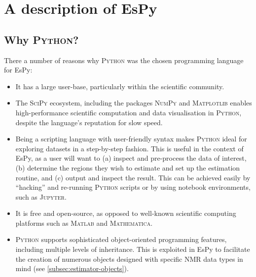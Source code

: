 \section{A description of \acs{EsPy}}

\subsection{Why \textsc{Python}?}
There a number of reasons why \textsc{Python} was the chosen programming
language for \ac{EsPy}:
\begin{itemize}
    \item It has a large user-base, particularly within the scientific
        community.
    \item The \textsc{SciPy} ecosystem\cite{Virtanen2020}, including the packages
        \textsc{NumPy}\cite{Harris2020} and
        \textsc{Matplotlib}\cite{Hunter2007} enables
        high-performance scientific computation and data visualisation in
        \textsc{Python}, despite the language's reputation for slow speed.
    \item Being a scripting language with user-friendly syntax makes
        \textsc{Python} ideal for exploring datasets in a step-by-step fashion.
        This is useful in the context of \ac{EsPy}, as a user will want to
        (a) inspect and pre-process the data of interest,
        (b) determine the regions they wish to estimate and set up the
        estimation routine,
        and (c) output and inspect the result.
        This can be achieved easily by ``hacking'' and re-running
        \textsc{Python} scripts or by using notebook environments, such as
        \textsc{Jupyter}.
    \item It is free and open-source, as opposed to well-known scientific
        computing platforms such as \textsc{Matlab} and \textsc{Mathematica}.
    \item \textsc{Python} supports sophisticated object-oriented programming
        features, including multiple levels of inheritance. This is exploited in
        \ac{EsPy} to facilitate the creation of numerous objects designed with
        specific \ac{NMR} data types in mind (see
        \cref{subsec:estimator-objects}).
\end{itemize}

